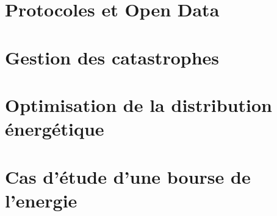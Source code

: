 













\section{Protocoles et Open Data}
\section{Gestion des catastrophes}
\section{Optimisation de la distribution énergétique}
\section{Cas d'étude d'une bourse de l'energie}
